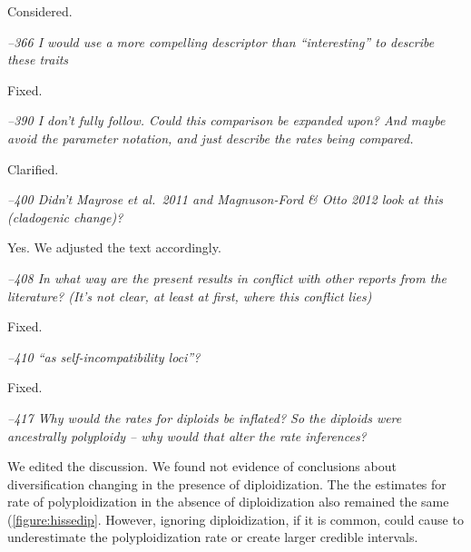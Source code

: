 \documentclass[11pt]{article}
\renewenvironment{quote}{\bigskip\noindent\itshape\ignorespaces}{\smallskip}
\begin{document}
Considered.


\begin{quote}
--366  I would use a more compelling descriptor than ``interesting'' to describe these traits
\end{quote}

Fixed.


\begin{quote}
--390  I don't fully follow.
Could this comparison be expanded upon?
And maybe avoid the parameter notation, and just describe the rates being compared.
\end{quote}

Clarified.


\begin{quote}
--400  Didn't Mayrose et al.\ 2011 and Magnuson-Ford \& Otto 2012 look at this (cladogenic change)?
\end{quote}

Yes. We adjusted the text accordingly.


\begin{quote}
--408  In what way are the present results in conflict with other reports from the literature?
(It's not clear, at least at first, where this conflict lies)
\end{quote}

Fixed.


\begin{quote}
--410  ``as self-incompatibility loci''?
\end{quote}

Fixed.

\begin{quote}
--417  Why would the rates for diploids be inflated?
So the diploids were ancestrally polyploidy -- why would that alter the rate inferences?
\end{quote}

We edited the discussion. We found not evidence of conclusions about diversification changing in the presence of diploidization. The  the estimates for rate of polyploidization in the absence of diploidization also remained the same (\cref{figure:hissedip}. However, ignoring diploidization, if it is common, could cause to underestimate the polyploidization rate or create larger credible intervals.
\end{document}
